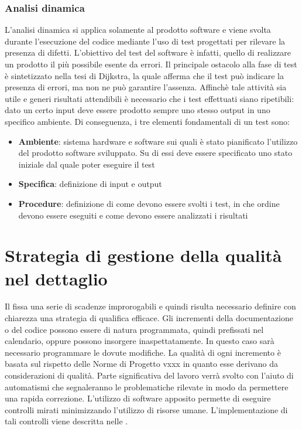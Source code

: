 \subsubsection{Analisi dinamica}

L’analisi dinamica si applica solamente al prodotto software e viene
svolta durante l’esecuzione del codice mediante l’uso di test
progettati per rilevare la presenza di difetti.
L’obiettivo del test del software è infatti, quello di
realizzare un prodotto il più possibile esente da errori. Il
principale ostacolo alla fase di test è sintetizzato nella tesi di
Dijkstra, la quale afferma che il test può indicare la presenza di
errori, ma non ne può garantire l’assenza.
Affinchè tale attività sia utile e generi risultati attendibili è
necessario che i test effettuati siano ripetibili: dato un certo input
deve essere prodotto sempre uno stesso output in uno specifico
ambiente. Di conseguenza, i tre elementi fondamentali di un test sono:

\begin{itemize}
\item \textbf{Ambiente}: sistema hardware e software sui quali è stato
  pianificato l’utilizzo del prodotto software sviluppato. Su di essi
  deve essere specificato uno stato iniziale dal quale poter eseguire
  il test

\item \textbf{Specifica}: definizione di input e output
\item \textbf{Procedure}: definizione di come devono essere svolti i
  test, in che ordine devono essere eseguiti e come devono essere
  analizzati i risultati
\end{itemize}




\section[Visione di dettaglio della qualità]{Strategia di gestione
  della qualità nel dettaglio}

Il \pianodiprogetto fissa una serie di scadenze improrogabili e quindi risulta necessario definire
con chiarezza una strategia di qualifica efficace. Gli incrementi della documentazione o del codice
possono essere di natura programmata, quindi prefissati nel calendario, oppure possono insorgere
inaspettatamente. In questo caso sarà necessario programmare le dovute
modifiche.
La qualità di ogni incremento è basata sul rispetto delle Norme di
Progetto vxxx in quanto esse derivano da considerazioni di qualità.
Parte significativa del lavoro
verrà svolto con l’aiuto di automatismi che segnaleranno le problematiche rilevate in modo da
permettere una rapida correzione. L’utilizzo di software apposito permette di eseguire controlli
mirati minimizzando l'utilizzo di risorse umane. L’implementazione di tali controlli viene descritta nelle
\normediprogetto .



